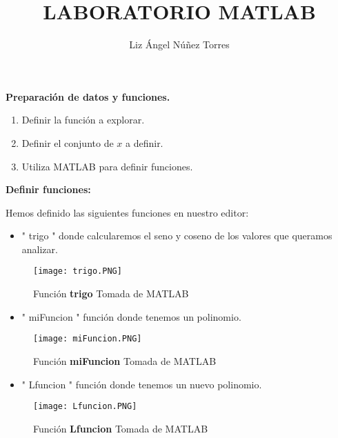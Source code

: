 \documentclass[letterpaper]{article}
\title{LABORATORIO MATLAB }
\author{Liz Ángel Núñez Torres}
\begin{document}
\begin{titlepage}
    \maketitle
\end{titlepage}

\begin{justify}
    \textbf{Preparación de datos y funciones.}
\end{justify}
\begin{enumerate}
    \item Definir la función a explorar.
    \item Definir el conjunto de \(x\) a definir.
    \item Utiliza MATLAB para definir funciones.
\end{enumerate}

\vspace{\baselineskip}

\begin{justify}
\textbf{Definir funciones:}    
\end{justify}
\begin{justify}
    Hemos definido las siguientes funciones en nuestro editor:
\end{justify}
\begin{itemize}
    \item " trigo "  donde calcularemos el seno y coseno de los valores que queramos analizar. 
\end{itemize}
\begin{figure}[H]
    \centering
    \texttt{[image: trigo.PNG]}
    \caption{Función \textbf{trigo} Tomada de MATLAB }    
\end{figure}
\begin{itemize}
    \item " miFuncion " función donde tenemos un polinomio. 
\end{itemize}
\begin{figure}[H]
    \centering
    \texttt{[image: miFuncion.PNG]}
    \caption{Función \textbf{miFuncion} Tomada de MATLAB }    
\end{figure}
\newpage
\begin{itemize}
    \item " Lfuncion " función donde tenemos un nuevo polinomio. 
\end{itemize}
\begin{figure}[H]
    \centering
    \texttt{[image: Lfuncion.PNG]}
    \caption{Función \textbf{Lfuncion} Tomada de MATLAB }    
\end{figure}
\end{document}
